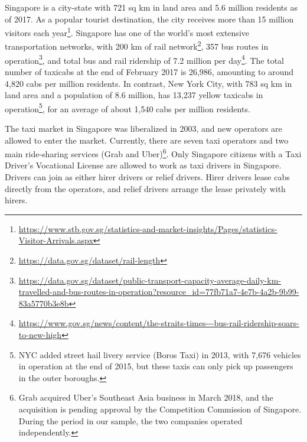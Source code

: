 \documentclass[reviewmode]{AEA}
\begin{document}
Singapore is a city-state with 721 sq km in land area and 5.6 million residents as of 2017. As a popular tourist destination, the city receives more than 15 million visitors each year\footnote{\url{https://www.stb.gov.sg/statistics-and-market-insights/Pages/statistics-Visitor-Arrivals.aspx}}.
Singapore has one of the world's most extensive transportation networks, with 200 km of rail network\footnote{\url{https://data.gov.sg/dataset/rail-length}},
357 bus routes in operation\footnote{\url{https://data.gov.sg/dataset/public-transport-capacity-average-daily-km-travelled-and-bus-routes-in-operation?resource_id=77fb71a7-4e7b-4a2b-9b99-83a5770b3e8b}},
and total bus and rail ridership of 7.2 million per day\footnote{\url{https://www.gov.sg/news/content/the-straits-times---bus-rail-ridership-soars-to-new-high}}.
The total number of taxicabs at the end of February 2017 is 26,986, amounting to around 4,820 cabs per million residents. In contrast, New York City, with 783 sq km in land area and a population of 8.6 million, has 13,237 yellow taxicabs in operation\footnote{NYC added street hail livery service (Boros Taxi) in 2013, with 7,676 vehicles in operation at the end of 2015, but these taxis can only pick up passengers in the outer boroughs.}, for an average of about 1,540 cabs per million residents.

The taxi market in Singapore was liberalized in 2003, and new operators are allowed to enter the market. Currently, there are seven taxi operators 
and two main ride-sharing services (Grab and Uber)\footnote{Grab acquired Uber's Southeast Asia business in March 2018, and the acquisition is pending approval by the Competition Commission of Singapore. During the period in our sample, the two companies operated independently.}. Only Singapore citizens with a Taxi Driver's Vocational License are allowed to work as taxi drivers in Singapore. Drivers can join as either hirer drivers or relief drivers. Hirer drivers lease cabs directly from the operators, and relief drivers arrange the lease privately with hirers.
\end{document}
